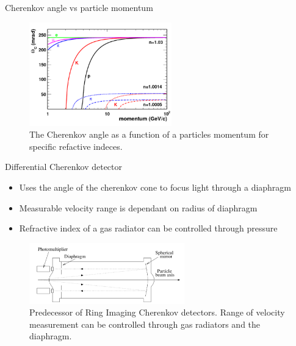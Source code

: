 \documentclass[aspectratio=1610, 10pt]{beamer}
\begin{document}
\begin{frame}{Cherenkov angle vs particle momentum}
  \begin{figure}
    \includegraphics[width=0.55\textwidth]{images/angle_momentum.png}
    \caption{The Cherenkov angle as a function of a particles momentum for specific refactive indeces.}
  \end{figure}
\end{frame}

\begin{frame}{Differential Cherenkov detector}
  \begin{itemize}
    \item Uses the angle of the cherenkov cone to focus light through a diaphragm
    \medskip
    \item Measurable velocity range is dependant on radius of diaphragm
    \medskip
    \item Refractive index of a gas radiator can be controlled through pressure
  \end{itemize}
    \begin{figure}
      \includegraphics[width=0.6\textwidth]{images/differential.png}
      \caption{Predecessor of Ring Imaging Cherenkov detectors. Range of velocity measurement can be controlled through
      gas radiators and the diaphragm.}
    \end{figure}
\end{frame}
\end{document}
